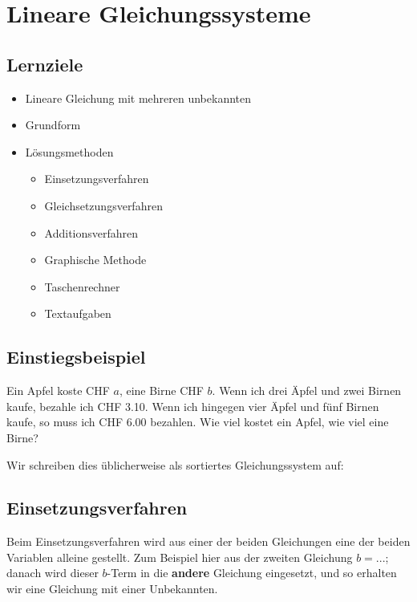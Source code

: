 \section{Lineare Gleichungssysteme}

\subsection*{Lernziele}
\begin{itemize}
	\item{Lineare Gleichung mit mehreren unbekannten}
	\item{Grundform}
	\item{Lösungsmethoden}
	\begin{itemize}
		\item{Einsetzungsverfahren}
		\item{Gleichsetzungsverfahren}
		\item{Additionsverfahren}
		\item{Graphische Methode}
		\item{Taschenrechner}
    \item Textaufgaben
	\end{itemize}

\end{itemize}

\newpage
\subsection{Einstiegsbeispiel}
Ein Apfel koste CHF $a$, eine Birne CHF $b$. Wenn ich drei Äpfel und zwei Birnen kaufe, bezahle ich CHF 3.10. Wenn ich hingegen vier Äpfel und fünf Birnen kaufe, so muss ich CHF 6.00 bezahlen. Wie viel kostet ein Apfel, wie viel eine Birne?

Wir schreiben dies üblicherweise als sortiertes Gleichungssystem auf:



\subsection{Einsetzungsverfahren}\label{einsetzungsverfahren}
Beim Einsetzungsverfahren wird aus einer der beiden Gleichungen eine der beiden Variablen alleine gestellt. Zum Beispiel hier aus der zweiten Gleichung $b = ...$; danach wird dieser $b$-Term in die \textbf{andere} Gleichung eingesetzt, und so erhalten wir eine Gleichung mit einer Unbekannten.

